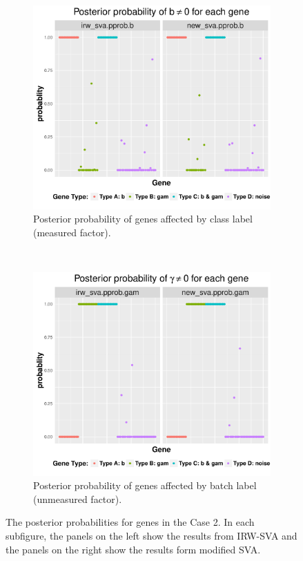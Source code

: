 \documentclass[11pt]{article}
\begin{document}
\begin{figure}[h!]
    \centering
    \begin{subfigure}[t]{0.45\textwidth}
    \centering
    \includegraphics[width = \textwidth]{figures/pprop2_2.pdf}
    \caption{Posterior probability of genes affected by class label (measured factor).}
    \label{fig:pprob2_1}
    \end{subfigure}
    ~
     \begin{subfigure}[t]{0.45\textwidth}
    \centering
    \includegraphics[width = \textwidth]{figures/pprop2_1.pdf}
    \caption{Posterior probability of genes affected by batch label (unmeasured factor).}
    \label{fig:pprob2_2}
    \end{subfigure}
    \caption{The posterior probabilities for genes in the Case 2. In each subfigure, the panels on the left show the results from IRW-SVA and the panels on the right show the results form modified SVA.}
    \label{fig:visual2}
\end{figure}
\end{document}
